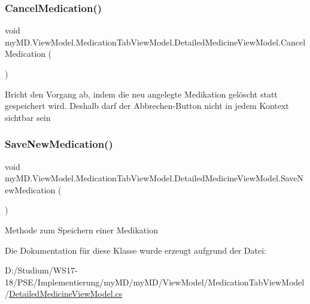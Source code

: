 \subsubsection{\texorpdfstring{Cancel\+Medication()}{CancelMedication()}}
{\footnotesize\ttfamily void my\+M\+D.\+View\+Model.\+Medication\+Tab\+View\+Model.\+Detailed\+Medicine\+View\+Model.\+Cancel\+Medication (\begin{DoxyParamCaption}{ }\end{DoxyParamCaption})}



Bricht den Vorgang ab, indem die neu angelegte Medikation gelöscht statt gespeichert wird. Deshalb darf der Abbrechen-\/\+Button nicht in jedem Kontext sichtbar sein 

\mbox{\label{classmy_m_d_1_1_view_model_1_1_medication_tab_view_model_1_1_detailed_medicine_view_model_ae30844bb875a0f1c59a450e9fd4ecebd}} 
\subsubsection{\texorpdfstring{Save\+New\+Medication()}{SaveNewMedication()}}
{\footnotesize\ttfamily void my\+M\+D.\+View\+Model.\+Medication\+Tab\+View\+Model.\+Detailed\+Medicine\+View\+Model.\+Save\+New\+Medication (\begin{DoxyParamCaption}{ }\end{DoxyParamCaption})}



Methode zum Speichern einer Medikation 



Die Dokumentation für diese Klasse wurde erzeugt aufgrund der Datei\+:\begin{DoxyCompactItemize}
\item 
D\+:/\+Studium/\+W\+S17-\/18/\+P\+S\+E/\+Implementierung/my\+M\+D/my\+M\+D/\+View\+Model/\+Medication\+Tab\+View\+Model/\mbox{\hyperlink{_detailed_medicine_view_model_8cs}{Detailed\+Medicine\+View\+Model.\+cs}}\end{DoxyCompactItemize}
